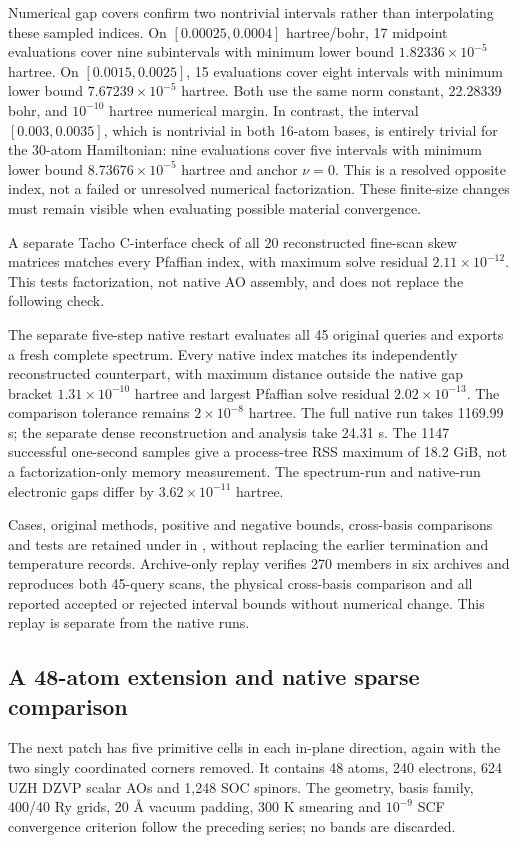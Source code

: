 \documentclass[11pt]{article}
\begin{document}
Numerical gap covers confirm two nontrivial intervals rather
than interpolating these sampled indices. On
$[0.00025,0.0004]$ hartree/bohr, 17 midpoint evaluations cover
nine subintervals with minimum lower bound
$1.82336\times10^{-5}$ hartree. On $[0.0015,0.0025]$,
15 evaluations cover eight intervals with minimum lower bound
$7.67239\times10^{-5}$ hartree. Both use the same norm
constant, 22.28339 bohr, and $10^{-10}$ hartree numerical margin.
In contrast, the interval $[0.003,0.0035]$, which is nontrivial
in both 16-atom bases, is entirely trivial for the 30-atom
Hamiltonian: nine evaluations cover five intervals with minimum
lower bound $8.73676\times10^{-5}$ hartree and anchor $\nu=0$.
This is a resolved opposite index, not a failed or unresolved
numerical factorization. These finite-size changes must remain
visible when evaluating possible material convergence.

A separate Tacho C-interface check of all 20 reconstructed
fine-scan skew matrices matches every Pfaffian index, with maximum
solve residual $2.11\times10^{-12}$. This tests factorization,
not native AO assembly, and does not replace the following check.

The separate five-step native restart evaluates all 45 original
queries and exports a fresh complete spectrum. Every native
index matches its independently reconstructed counterpart, with
maximum distance outside the native gap bracket
$1.31\times10^{-10}$ hartree and largest Pfaffian solve
residual $2.02\times10^{-13}$. The comparison tolerance remains
$2\times10^{-8}$ hartree. The full native run takes 1169.99 s;
the separate dense reconstruction and analysis take 24.31 s.
The 1147 successful one-second samples give a process-tree RSS
maximum of 18.2 GiB, not a factorization-only memory measurement.
The spectrum-run and native-run electronic gaps differ by
$3.62\times10^{-11}$ hartree.

Cases, original methods, positive and negative bounds, cross-basis
comparisons and tests are retained under 
in , without replacing the
earlier termination and temperature records.
Archive-only replay verifies 270 members in six archives and
reproduces both 45-query scans, the physical cross-basis comparison
and all reported accepted or rejected interval bounds without
numerical change. This replay is separate from the native runs.

\subsection{A 48-atom extension and native sparse comparison}
The next patch has five primitive cells in each in-plane direction,
again with the two singly coordinated corners removed. It contains
48 atoms, 240 electrons, 624 UZH DZVP scalar AOs and 1,248 SOC
spinors. The geometry, basis family, 400/40 Ry grids, 20 \AA{}
vacuum padding, 300 K smearing and $10^{-9}$ SCF convergence
criterion follow the preceding series; no bands are discarded.
\end{document}

